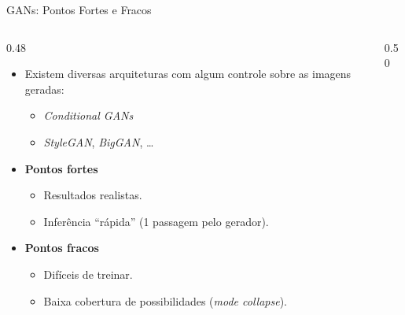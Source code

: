 \documentclass[aspectratio=169,xcolor=dvipsnames]{beamer}
\begin{document}
  \begin{frame}{GANs: Pontos Fortes e Fracos}
    \begin{columns}[T]
      \begin{column}{0.48\textwidth}
        \begin{itemize}
          \item Existem diversas arquiteturas com algum controle sobre
          as imagens geradas:
          \begin{itemize}
            \item \textit{Conditional GANs}
            \item \textit{StyleGAN}, \textit{BigGAN}, \ldots
          \end{itemize}
          \item \textbf{Pontos fortes}
          \begin{itemize}
            \item Resultados realistas.
            \item Inferência ``rápida'' (1 passagem pelo gerador).
          \end{itemize}
          \item \textbf{Pontos fracos}
          \begin{itemize}
            \item Difíceis de treinar.
            \item Baixa cobertura de possibilidades (\emph{mode
            collapse}).
          \end{itemize}
        \end{itemize}
      \end{column}
      \begin{column}{0.50\textwidth}
        \centering
        \resizebox{\linewidth}{!}{\ganpipelinefigure}
      \end{column}
    \end{columns}
  \end{frame}
\end{document}
